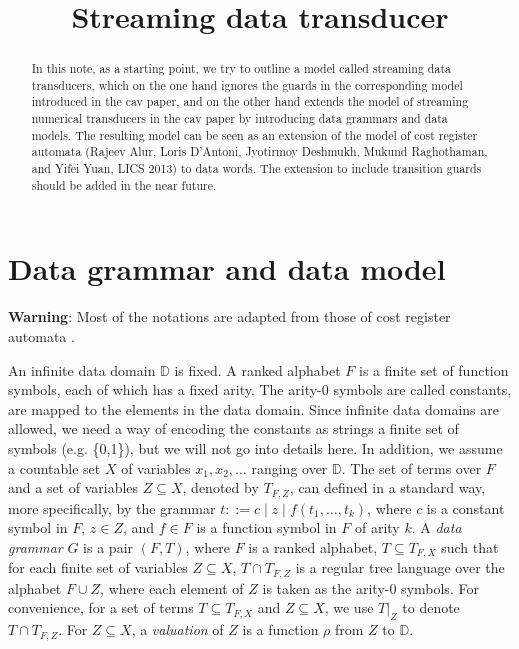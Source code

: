 \documentclass[runningheads,a4paper]{llncs}
\title{Streaming data transducer}
\author{}
\institute{}
\newcommand\dd{\mathbb{D}}
\begin{document}
\maketitle


\begin{abstract}
In this note, as a starting point, we try to outline a model called streaming data transducers, which on the one hand ignores the guards in the corresponding model introduced in the cav paper, and on the other hand extends the model of streaming numerical transducers in the cav paper by introducing data grammars and data models. The resulting model can be seen as an extension of the model of cost register automata (Rajeev Alur, Loris D'Antoni, Jyotirmoy Deshmukh, Mukund Raghothaman,  and Yifei Yuan, LICS 2013) to data words. The extension to include transition guards should be added in the near future.
\end{abstract}



\section{Data grammar and data model}

{\bf Warning}: Most of the notations are adapted from those of cost register automata \cite{ADD+13}.

An infinite data domain $\dd$ is fixed.
A ranked alphabet $F$ is a finite set of function symbols, each of which has a fixed arity. The arity-0 symbols are called constants, are mapped to the elements in the data domain. Since infinite data domains are allowed, we need a way of encoding the constants as strings a finite set of symbols (e.g. \{0,1\}), but we will not go into details here. In addition, we assume a  countable set $X$ of variables $x_1, x_2,\dots$ ranging over $\dd$.  The set of terms over $F$ and a set of variables $Z \subseteq X$, denoted by $T_{F, Z}$, can defined in a standard way, more specifically, by the grammar $t::= c \mid z  \mid f(t_1,\dots, t_k)$, where $c$ is a constant symbol in $F$, $z \in Z$, and $f \in F$ is a function symbol in $F$ of arity $k$. A \emph{data grammar} $G$ is a pair $(F, T)$, where $F$ is a ranked alphabet, $T \subseteq T_{F,X}$ such that for each finite set of variables $Z \subseteq X$, $T \cap T_{F, Z}$ is a regular tree language over the alphabet $F \cup Z$, where each element of $Z$ is taken as the arity-0 symbols.  For convenience, for a set of terms $T \subseteq T_{F,X}$ and $Z \subseteq X$, we use $T \vert_Z$ to denote $T \cap T_{F,Z}$.  For $Z \subseteq X$, a \emph{valuation} of $Z$ is a function $\rho$ from $Z$ to $\dd$. 
\end{document}
